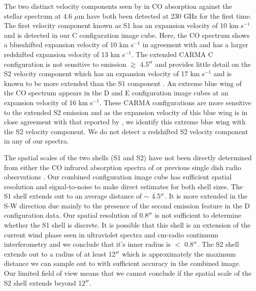 \documentclass[manuscript]{aastex}
\begin{document}
The two distinct velocity components seen by \cite{bern79} in CO absorption against the stellar spectrum at 4.6 $\mu$m have both been detected at 230 GHz for the first time. The first velocity component known as S1 has an expansion velocity of 10 km s${}^{-1}$ \citep{bern79} and is detected in our C configuration image cube. Here, the CO spectrum shows a blueshifted expansion velocity of 10 km s${}^{-1}$ in agreement with \cite{bern79} and has a larger redshifted expansion velocity of 13 km s${}^{-1}$. The extended CARMA C configuration is not sensitive to emission $\gtrsim$ 4.5$\mbox{$^{\prime\prime}$}$ and provides little detail on the S2 velocity component which has an expansion velocity of 17 km s${}^{-1}$ \citep{bern79} and is known to be more extended than the S1 component \citep{bern79, hugg86}. An extreme blue wing of the CO spectrum appears in the D and E configuration image cubes at an expansion velocity of 16 km s${}^{-1}$. These CARMA configurations are more sensitive to the extended S2 emission and as the expansion velocity of this blue wing is in close agreement with that reported by \cite{bern79}, we identify this extreme blue wing with the S2 velocity component. We do not detect a redshifted S2 velocity component in any of our spectra. 

The spatial scales of the two shells (S1 and S2) have not been directly determined from either the CO infrared absorption spectra of \cite{bern79} or previous single dish radio observations \citep{knap80, hugg86, hugg94}. Our combined configuration image cube has sufficient spatial resolution and signal-to-noise to make direct estimates for both shell sizes. The S1 shell extends out to an average distance of $\sim$ 4.5$\mbox{$^{\prime\prime}$}$. It is more extended in the S-W direction due mainly to the presence of the second emission feature in the D configuration data. Our spatial resolution of 0.8$\mbox{$^{\prime\prime}$}$ is not sufficient to determine whether the S1 shell is discrete. It is possible that this shell is an extension of the current wind phase seen in ultraviolet spectra \citep{carp97} and cm-radio continuum interferometry \citep{lim98, harp01} and we conclude that it's inner radius is $<$ 0.8$\mbox{$^{\prime\prime}$}$. The S2 shell extends out to a radius of at least 12$\mbox{$^{\prime\prime}$}$ which is approximately the maximum distance we can sample out to with sufficient accuracy in the combined image. Our limited field of view means that we cannot conclude if the spatial scale of the S2 shell extends beyond 12$\mbox{$^{\prime\prime}$}$. 
\end{document}
